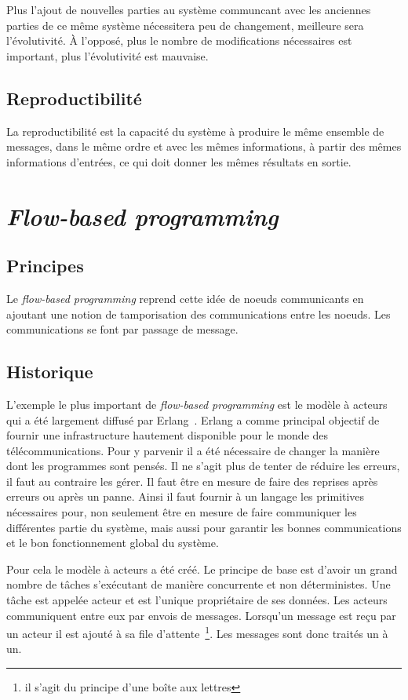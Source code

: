 \documentclass{article}
\begin{document}
Plus l'ajout de nouvelles parties au système communcant avec les anciennes parties
de ce même système nécessitera peu de changement, meilleure sera l'évolutivité.
À l'opposé, plus le nombre de modifications nécessaires est important, plus l'évolutivité
est mauvaise.

\subsection{Reproductibilité}
La reproductibilité est la capacité du système à produire le même ensemble de messages,
dans le même ordre et avec les mêmes informations, à partir des mêmes informations d'entrées,
ce qui doit donner les mêmes résultats en sortie.


\section{\emph{Flow-based programming}}\label{flow-based}

\subsection{Principes}\label{principes}

Le \emph{flow-based programming} reprend cette idée de noeuds
communicants en ajoutant une notion de tamporisation des communications
entre les noeuds. Les communications se font par passage de message.

\subsection{Historique}\label{historique}
L'exemple le plus important de \emph{flow-based programming} est le modèle à acteurs~\cite{actors}
qui a été largement diffusé par Erlang~\cite{erlang}.
Erlang a comme principal objectif de fournir une infrastructure hautement disponible
pour le monde des télécommunications.
Pour y parvenir il a été nécessaire de changer la manière dont les programmes sont pensés.
Il ne s'agit plus de tenter de réduire les erreurs, il faut au contraire les gérer.
Il faut être en mesure de faire des reprises après erreurs ou après un panne.
Ainsi il faut fournir à un langage les primitives nécessaires pour, non seulement
être en mesure de faire communiquer les différentes partie du système, mais aussi
pour garantir les bonnes communications et le bon fonctionnement global du système.

Pour cela le modèle à acteurs a été créé. Le principe de base est d'avoir un grand
nombre de tâches s'exécutant de manière concurrente et non déterministes.
Une tâche est appelée acteur et est l'unique propriétaire de ses données.
Les acteurs communiquent entre eux par envois de messages.
Lorsqu'un message est reçu par un acteur il est ajouté à sa file d'attente~\footnote{il s'agit du principe d'une boîte aux lettres}.
Les messages sont donc traités un à un.
\end{document}
